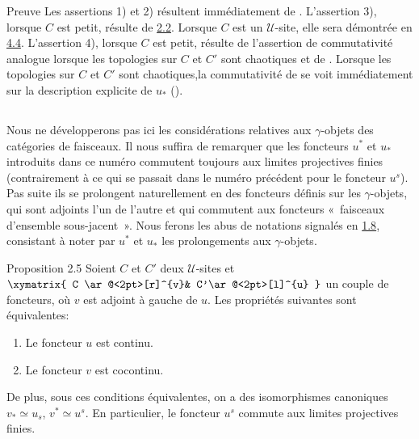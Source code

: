 \documentclass[10pt]{../fichiers-configuration-latex/smfart}
\begin{document}
\begin{enonce*}[remark]{Preuve}
Les assertions 1) et 2) résultent immédiatement de .
L'assertion 3), lorsque $C$ est petit, résulte de \hyperref[III.prop2.2]{2.2}.
Lorsque $C$ est un $𝒰$-site, elle sera démontrée en
\hyperref[III.subsec4.4]{4.4}. L'assertion 4), lorsque $C$ est petit, résulte
de l'assertion de commutativité analogue lorsque les topologies sur
$C$ et $C'$ sont chaotiques et de . Lorsque les
topologies sur $C$ et $C'$ sont chaotiques,\pageoriginale la
commutativité de  se voit immédiatement sur la
description explicite de $u_{\ast}$ ().
\end{enonce*}

\setcounter{subsection}{3}
\subsection{}
Nous ne développerons pas ici les considérations relatives aux
$\gamma$-objets des catégories de faisceaux. Il nous suffira de
remarquer que les foncteurs $u^{\ast}$ et $u_{\ast}$ introduits dans
ce numéro commutent toujours aux limites projectives finies
(contrairement à ce qui se passait dans le numéro précédent pour le
foncteur $u^s$). Pas suite ils se prolongent naturellement en des
foncteurs définis sur les $\gamma$-objets, qui sont adjoints l'un de
l'autre et qui commutent aux foncteurs « faisceaux d'ensemble
sous-jacent ». Nous ferons les abus de notations signalés en
\hyperref[III.not1.8]{1.8}, consistant à noter par $u^{\ast}$ et $u_{\ast}$
les prolongements aux $\gamma$-objets.

\begin{enonce*}{Proposition 2.5}
Soient $C$ et $C'$ deux $𝒰$-sites et $\xymatrix{ C
\ar@<2pt>[r]^{v}& C'\ar@<2pt>[l]^{u} }$ un couple de foncteurs, où
$v$ est adjoint à gauche de $u$. Les propriétés suivantes
sont équivalentes:
\begin{enumerate}
\renewcommand{\theenumi}{\roman{enumi}}
\renewcommand{\labelenumi}{\theenumi)}
\item Le foncteur $u$ est continu.

\item Le foncteur $v$ est cocontinu.
\end{enumerate}
De plus, sous ces conditions équivalentes, on a des
isomorphismes canoniques $v_{\ast}\simeq u_{s}$, $v^{\ast}\simeq
u^s$. En particulier, le foncteur $u^s$ commute aux limites
projectives finies.
\end{enonce*}
\end{document}
